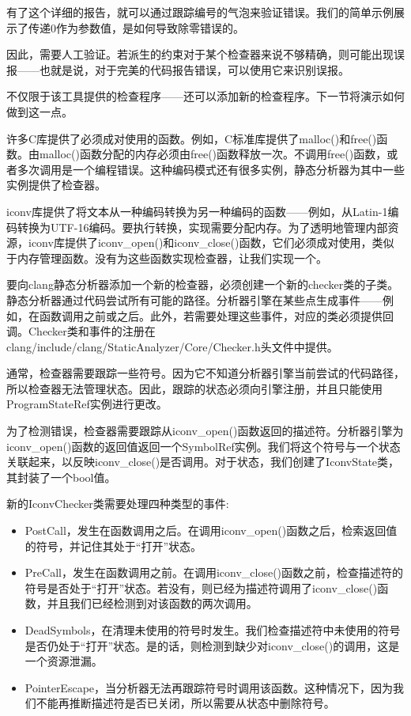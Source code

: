 有了这个详细的报告，就可以通过跟踪编号的气泡来验证错误。我们的简单示例展示了传递0作为参数值，是如何导致除零错误的。

因此，需要人工验证。若派生的约束对于某个检查器来说不够精确，则可能出现误报——也就是说，对于完美的代码报告错误，可以使用它来识别误报。

不仅限于该工具提供的检查程序——还可以添加新的检查程序。下一节将演示如何做到这一点。


许多C库提供了必须成对使用的函数。例如，C标准库提供了malloc()和free()函数。由malloc()函数分配的内存必须由free()函数释放一次。不调用free()函数，或者多次调用是一个编程错误。这种编码模式还有很多实例，静态分析器为其中一些实例提供了检查器。

iconv库提供了将文本从一种编码转换为另一种编码的函数——例如，从Latin-1编码转换为UTF-16编码。要执行转换，实现需要分配内存。为了透明地管理内部资源，iconv库提供了iconv\_open()和iconv\_close()函数，它们必须成对使用，类似于内存管理函数。没有为这些函数实现检查器，让我们实现一个。

要向clang静态分析器添加一个新的检查器，必须创建一个新的checker类的子类。静态分析器通过代码尝试所有可能的路径。分析器引擎在某些点生成事件——例如，在函数调用之前或之后。此外，若需要处理这些事件，对应的类必须提供回调。Checker类和事件的注册在clang/include/clang/StaticAnalyzer/Core/Checker.h头文件中提供。

通常，检查器需要跟踪一些符号。因为它不知道分析器引擎当前尝试的代码路径，所以检查器无法管理状态。因此，跟踪的状态必须向引擎注册，并且只能使用ProgramStateRef实例进行更改。

为了检测错误，检查器需要跟踪从iconv\_open()函数返回的描述符。分析器引擎为iconv\_open()函数的返回值返回一个SymbolRef实例。我们将这个符号与一个状态关联起来，以反映iconv\_close()是否调用。对于状态，我们创建了IconvState类，其封装了一个bool值。

新的IconvChecker类需要处理四种类型的事件:

\begin{itemize}
\item
PostCall，发生在函数调用之后。在调用iconv\_open()函数之后，检索返回值的符号，并记住其处于“打开”状态。

\item
PreCall，发生在函数调用之前。在调用iconv\_close()函数之前，检查描述符的符号是否处于“打开”状态。若没有，则已经为描述符调用了iconv\_close()函数，并且我们已经检测到对该函数的两次调用。

\item
DeadSymbols，在清理未使用的符号时发生。我们检查描述符中未使用的符号是否仍处于“打开”状态。是的话，则检测到缺少对iconv\_close()的调用，这是一个资源泄漏。

\item
PointerEscape，当分析器无法再跟踪符号时调用该函数。这种情况下，因为我们不能再推断描述符是否已关闭，所以需要从状态中删除符号。
\end{itemize}

